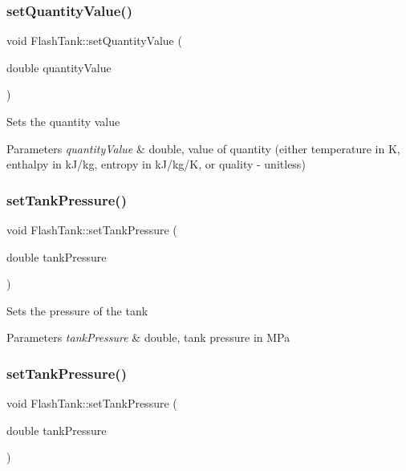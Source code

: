 \subsubsection{\texorpdfstring{set\+Quantity\+Value()}{setQuantityValue()}\hspace{0.1cm}{\footnotesize\ttfamily [3/3]}}
{\footnotesize\ttfamily void Flash\+Tank\+::set\+Quantity\+Value (\begin{DoxyParamCaption}\item[{double}]{quantity\+Value }\end{DoxyParamCaption})}

Sets the quantity value 
\begin{DoxyParams}{Parameters}
{\em quantity\+Value} & double, value of quantity (either temperature in K, enthalpy in k\+J/kg, entropy in k\+J/kg/K, or quality -\/ unitless) \\
\hline
\end{DoxyParams}
\mbox{\label{class_flash_tank_a8b3bb51a62dac4f76284dfdc114d83fe}} 
\subsubsection{\texorpdfstring{set\+Tank\+Pressure()}{setTankPressure()}\hspace{0.1cm}{\footnotesize\ttfamily [1/3]}}
{\footnotesize\ttfamily void Flash\+Tank\+::set\+Tank\+Pressure (\begin{DoxyParamCaption}\item[{double}]{tank\+Pressure }\end{DoxyParamCaption})}

Sets the pressure of the tank 
\begin{DoxyParams}{Parameters}
{\em tank\+Pressure} & double, tank pressure in M\+Pa \\
\hline
\end{DoxyParams}
\mbox{\label{class_flash_tank_a8b3bb51a62dac4f76284dfdc114d83fe}} 
\subsubsection{\texorpdfstring{set\+Tank\+Pressure()}{setTankPressure()}\hspace{0.1cm}{\footnotesize\ttfamily [2/3]}}
{\footnotesize\ttfamily void Flash\+Tank\+::set\+Tank\+Pressure (\begin{DoxyParamCaption}\item[{double}]{tank\+Pressure }\end{DoxyParamCaption})}

